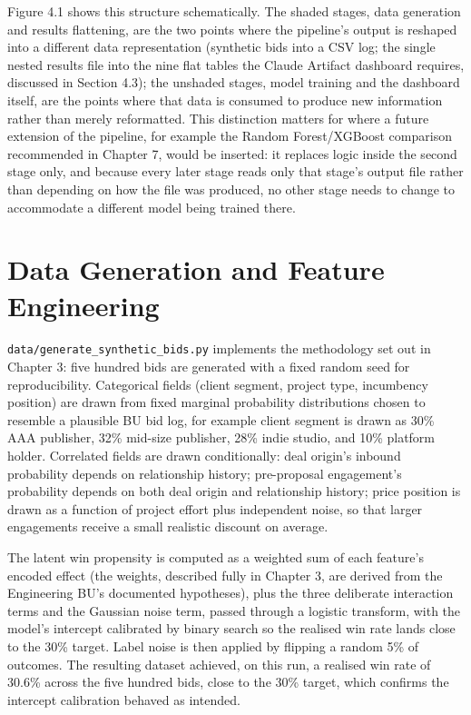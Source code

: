 Figure 4.1 shows this structure schematically. The shaded stages, data
generation and results flattening, are the two points where the
pipeline's output is reshaped into a different data representation
(synthetic bids into a CSV log; the single nested results file into the
nine flat tables the Claude Artifact dashboard requires, discussed in
Section 4.3); the unshaded stages, model training and the dashboard
itself, are the points where that data is consumed to produce new
information rather than merely reformatted. This distinction matters for
where a future extension of the pipeline, for example the Random
Forest/XGBoost comparison recommended in Chapter 7, would be inserted:
it replaces logic inside the second stage only, and because every later
stage reads only that stage's output file rather than depending on how
the file was produced, no other stage needs to change to accommodate a
different model being trained there.

\hypertarget{data-generation-and-feature-engineering}{%
\section{Data Generation and Feature
Engineering}\label{data-generation-and-feature-engineering}}

\texttt{data/generate\_synthetic\_bids.py} implements the methodology
set out in Chapter 3: five hundred bids are generated with a fixed
random seed for reproducibility. Categorical fields (client segment,
project type, incumbency position) are drawn from fixed marginal
probability distributions chosen to resemble a plausible BU bid log, for
example client segment is drawn as 30\% AAA publisher, 32\% mid-size
publisher, 28\% indie studio, and 10\% platform holder. Correlated
fields are drawn conditionally: deal origin's inbound probability
depends on relationship history; pre-proposal engagement's probability
depends on both deal origin and relationship history; price position is
drawn as a function of project effort plus independent noise, so that
larger engagements receive a small realistic discount on average.

The latent win propensity is computed as a weighted sum of each
feature's encoded effect (the weights, described fully in Chapter 3, are
derived from the Engineering BU's documented hypotheses), plus the three
deliberate interaction terms and the Gaussian noise term, passed through
a logistic transform, with the model's intercept calibrated by binary
search so the realised win rate lands close to the 30\% target. Label
noise is then applied by flipping a random 5\% of outcomes. The
resulting dataset achieved, on this run, a realised win rate of 30.6\%
across the five hundred bids, close to the 30\% target, which confirms
the intercept calibration behaved as intended.

